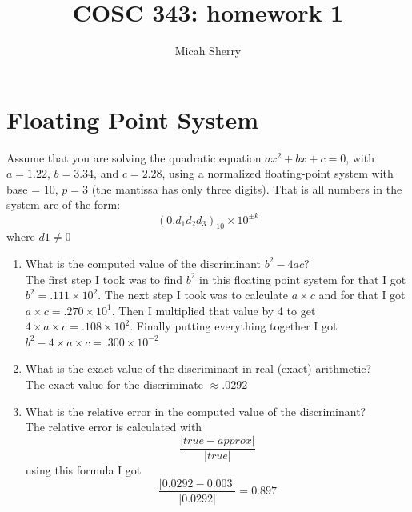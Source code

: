 \documentclass{article}
\title{COSC 343: homework 1}
\author{Micah Sherry}
\begin{document}
\maketitle

\section{Floating Point System}

Assume that you are solving the quadratic equation $ ax^2 + bx + c = 0 $, 
with $ a = 1.22 $, $ b = 3.34 $, 
and $ c = 2.28 $, using a normalized floating-point system with base = 10, $ p = 3 $ 
(the mantissa has only three digits). That is all numbers in the system are of the form:
$$ (0.d_1d_2d_3)_{10} \times 10^{\pm k}$$
where $d1 \neq 0$ 
    \begin{enumerate}
        \item What is the computed value of the discriminant $ b^2- 4ac$? 
        \\ The first step I took was to find $b^2$ in this floating point system for that I got $b^2 = .111 \times 10^2$. The next step I took was to calculate $ a \times c$ and for that I got $ a \times c = .270 \times 10^1$. Then I multiplied that value by 4 to get $ 4\times a \times c = .108 \times 10^2 $. Finally putting everything together I got $b^2 - 4\times a \times c = .300\times 10^{-2}$
        \item What is the exact value of the discriminant in real (exact) arithmetic?
        \\ The exact value for the discriminate $ \approx .0292 $
        \item What is the relative error in the computed value of the discriminant?
        \\ The relative error is calculated with $$ \frac{|true - approx|}{|true|}$$ using this formula I got $$\frac{|0.0292 - 0.003|}{|0.0292|}= 0.897$$
    \end{enumerate}
\end{document}
